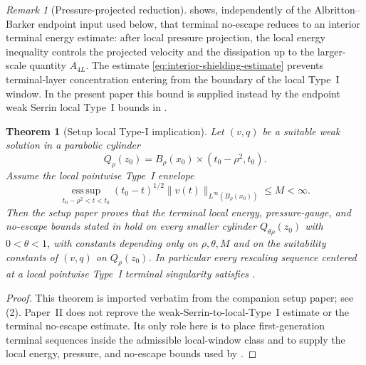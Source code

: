 \documentclass[11pt]{amsart}
\numberwithin{equation}{section}
\theoremstyle{plain}
\newtheorem{theorem}{Theorem}[section]
\theoremstyle{definition}
\theoremstyle{remark}
\newtheorem{remark}[remark]{Remark}
\newcommand{\esssup}{\operatorname*{ess\,sup}}
\begin{document}
\begin{remark}[Pressure-projected reduction]
\label{rem:narrowed-final-implication}
 shows, independently of the
Albritton--Barker endpoint input used below, that terminal no-escape reduces
to an interior terminal energy estimate: after local pressure projection, the local
energy inequality controls the projected velocity and the dissipation up to the
larger-scale quantity \(A_{4L}\).  The estimate
\eqref{eq:interior-shielding-estimate} prevents
terminal-layer concentration entering from the boundary of the local Type~I
window.  In the present paper this bound is supplied
instead by the endpoint weak Serrin local Type~I bounds in
.
\end{remark}

\begin{theorem}[Setup local Type-I implication]
\label{thm:AB-weak-serrin-typeI-estimate}
Let \((v,q)\) be a suitable weak solution in a parabolic cylinder
\[
   Q_\rho(z_0)=B_\rho(x_0)\times(t_0-\rho^2,t_0).
\]
Assume the local pointwise Type~I envelope
\[
   \esssup_{t_0-\rho^2<t<t_0}
   (t_0-t)^{1/2}\|v(t)\|_{L^\infty(B_\rho(x_0))}\le M<\infty .
\]
Then the setup paper proves that the terminal local energy, pressure-gauge,
and no-escape bounds stated in
 hold on every smaller cylinder
\(Q_{\theta\rho}(z_0)\) with \(0<\theta<1\), with constants depending only on
\(\rho,\theta,M\) and on the suitability constants of \((v,q)\) on
\(Q_\rho(z_0)\).  In particular every rescaling sequence centered at a local
pointwise Type~I terminal singularity satisfies
.
\end{theorem}

\begin{proof}
This theorem is imported verbatim from the companion setup paper; see
\,(2).  Paper~II does not reprove the
weak-Serrin-to-local-Type~I estimate or the terminal no-escape estimate.  Its
only role here is to place first-generation terminal sequences inside the
admissible local-window class and to supply the local energy, pressure, and
no-escape bounds used by
.
\end{proof}
\end{document}
